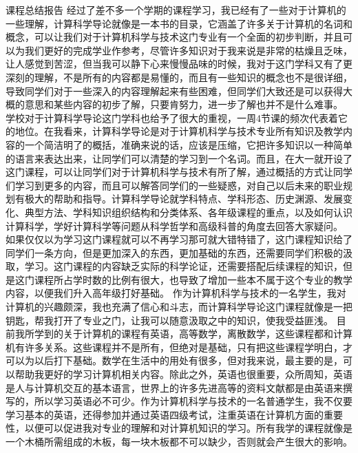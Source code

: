                                                课程总结报告                 
    经过了差不多一个学期的课程学习，我已经有了一些对于计算机的一些理解，计算科学导论就像是一本书的目录，它涵盖了许多关于计算机的名词和概念，可以让我们对于计算机科学与技术这门专业有一个全面的初步判断，并且可以为我们更好的完成学业作参考，尽管许多知识对于我来说是非常的枯燥且乏味，让人感觉到苦涩，但当我可以静下心来慢慢品味的时候，我对于这门学科又有了更深刻的理解，不是所有的内容都是易懂的，而且有一些知识的概念也不是很详细，导致同学们对于一些深入的内容理解起来有些困难，但同学们大致还是可以获得大概的意思和某些内容的初步了解，只要肯努力，进一步了解也并不是什么难事。
   学校对于计算科学导论这门学科也给予了很大的重视，一周4节课的频次代表着它的地位。在我看来，计算科学导论是对于计算机科学与技术专业所有知识及教学内容的一个简洁明了的概括，准确来说的话，应该是压缩，它把许多知识以一种简单的语言来表达出来，让同学们可以清楚的学习到一个名词。而且，在大一就开设了这门课程，可以让同学们对于计算机科学与技术有所了解，通过概括的方式让同学们学习到更多的内容，而且可以解答同学们的一些疑惑，对自己以后未来的职业规划有极大的帮助和指导。计算科学导论就学科特点、学科形态、历史渊源、发展变化、典型方法、学科知识组织结构和分类体系、各年级课程的重点，以及如何认识计算科学，学好计算科学等问题从科学哲学和高级科普的角度去回答大家疑问。
   如果仅仅以为学习这门课程就可以不再学习那可就大错特错了，这门课程知识给了同学们一条方向，但是更加深入的东西，更加基础的东西，还需要同学们积极的汲取，学习。这门课程的内容缺乏实际的科学论证，还需要搭配后续课程的知识，但是这门课程所占学时数的比例有很大，也导致了增加一些本不属于这个专业的教学内容，以便我们升入高年级打好基础。
    作为计算机科学与技术的一名学生，我对计算机的兴趣颇深，我也充满了信心和斗志，而计算科学导论这门课程就像是一把钥匙，帮我打开了专业之门，让我可以随意汲取之中的知识，使我受益匪浅。
    目前我所学到的关于计算机的课程有英语，高等数学，离散数学，这些课程都和计算机有许多关系。这些课程并不是所有，但绝对是基础，只有把这些课程学明白，才可以为以后打下基础。数学在生活中的用处有很多，但对我来说，最主要的是，可以帮助我更好的学习计算机相关内容。除此之外，英语也很重要，众所周知，英语是人与计算机交互的基本语言，世界上的许多先进高等的资料文献都是由英语来撰写的，所以学习英语必不可少。作为计算机科学与技术的一名普通学生，我不仅要学习基本的英语，还得参加并通过英语四级考试，注重英语在计算机方面的重要性，以便可以促进我对专业的理解和对计算机知识的学习。所有我学的课程就像是一个木桶所需组成的木板，每一块木板都不可以缺少，否则就会产生很大的影响。

